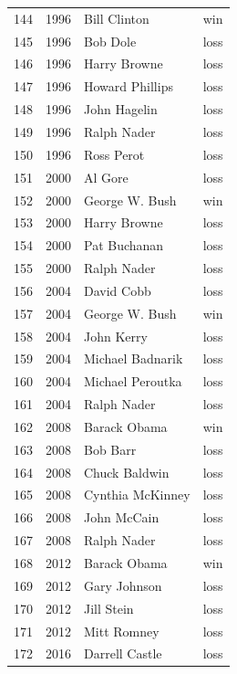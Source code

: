 \documentclass[
  letterpaper,
  DIV=11,
  numbers=noendperiod]{scrreprt}
\begin{document}
\begin{tabular}{lrll}
144 &  1996 &            Bill Clinton &    win \\
145 &  1996 &                Bob Dole &   loss \\
146 &  1996 &            Harry Browne &   loss \\
147 &  1996 &         Howard Phillips &   loss \\
148 &  1996 &            John Hagelin &   loss \\
149 &  1996 &             Ralph Nader &   loss \\
150 &  1996 &              Ross Perot &   loss \\
151 &  2000 &                 Al Gore &   loss \\
152 &  2000 &          George W. Bush &    win \\
153 &  2000 &            Harry Browne &   loss \\
154 &  2000 &            Pat Buchanan &   loss \\
155 &  2000 &             Ralph Nader &   loss \\
156 &  2004 &              David Cobb &   loss \\
157 &  2004 &          George W. Bush &    win \\
158 &  2004 &              John Kerry &   loss \\
159 &  2004 &        Michael Badnarik &   loss \\
160 &  2004 &        Michael Peroutka &   loss \\
161 &  2004 &             Ralph Nader &   loss \\
162 &  2008 &            Barack Obama &    win \\
163 &  2008 &                Bob Barr &   loss \\
164 &  2008 &           Chuck Baldwin &   loss \\
165 &  2008 &        Cynthia McKinney &   loss \\
166 &  2008 &             John McCain &   loss \\
167 &  2008 &             Ralph Nader &   loss \\
168 &  2012 &            Barack Obama &    win \\
169 &  2012 &            Gary Johnson &   loss \\
170 &  2012 &              Jill Stein &   loss \\
171 &  2012 &             Mitt Romney &   loss \\
172 &  2016 &          Darrell Castle &   loss \\

\end{tabular}
\end{document}
